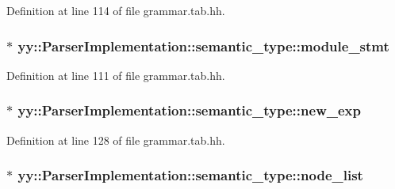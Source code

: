 Definition at line 114 of file grammar.tab.hh.

\hypertarget{unionyy_1_1_parser_implementation_1_1semantic__type_afe6f2681317e03ece6cb2d1ad5e0b2d1}{
\subsubsection[{module\_\-stmt}]{$\ast$ {\bf yy::ParserImplementation::semantic\_\-type::module\_\-stmt}}}
\label{unionyy_1_1_parser_implementation_1_1semantic__type_afe6f2681317e03ece6cb2d1ad5e0b2d1}


Definition at line 111 of file grammar.tab.hh.

\hypertarget{unionyy_1_1_parser_implementation_1_1semantic__type_a1e869dbcf7250f1b3844b9838eb75a7e}{
\subsubsection[{new\_\-exp}]{$\ast$ {\bf yy::ParserImplementation::semantic\_\-type::new\_\-exp}}}
\label{unionyy_1_1_parser_implementation_1_1semantic__type_a1e869dbcf7250f1b3844b9838eb75a7e}


Definition at line 128 of file grammar.tab.hh.

\hypertarget{unionyy_1_1_parser_implementation_1_1semantic__type_aa4a933ebafa4535a4778180f242de4bb}{
\subsubsection[{node\_\-list}]{$\ast$ {\bf yy::ParserImplementation::semantic\_\-type::node\_\-list}}}
\label{unionyy_1_1_parser_implementation_1_1semantic__type_aa4a933ebafa4535a4778180f242de4bb}


